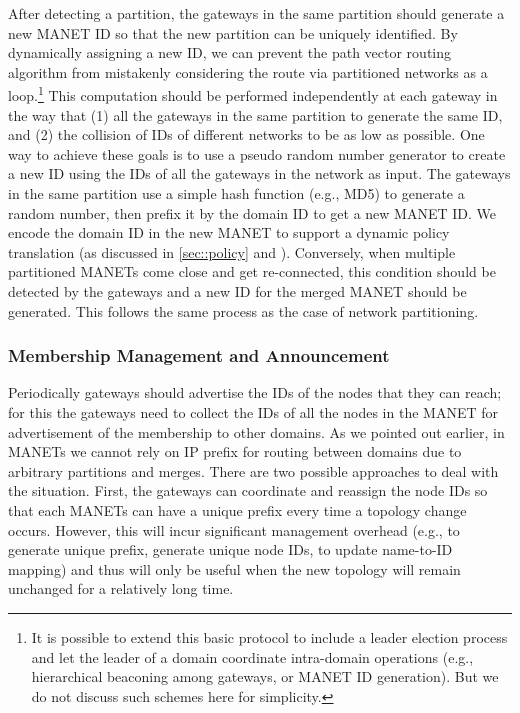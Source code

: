 After detecting a partition, the gateways in the same partition should generate a new MANET ID so that the new partition can be uniquely identified. By dynamically assigning a new ID, we can prevent the path vector routing algorithm from mistakenly considering the route via partitioned networks as a loop.\footnote{\small It is possible to extend this basic protocol to include a leader election process and let the leader of a domain coordinate intra-domain operations (e.g., hierarchical beaconing among gateways, or MANET ID generation). But we do not discuss such schemes here for simplicity.}
This computation should be performed independently at each gateway in the way that (1) all the gateways in the same partition to generate the same ID, and (2) the collision of IDs of different networks to be as low as possible. One way to achieve these goals is to use a pseudo random number generator to create a new ID using the IDs of all the gateways in the network as input. The gateways in the same partition use a simple hash function (e.g., MD5) to generate a random number, then prefix it by the domain ID to get a new MANET ID. We encode the domain ID in the new MANET to support a dynamic policy translation (as discussed in \ref{sec::policy} and \cite{policy08}). 
Conversely, when multiple partitioned MANETs come close and get re-connected, this condition should be detected by the gateways and a new ID for the merged MANET should be generated. This follows the same process as the case of network partitioning.

\subsubsection{Membership Management and Announcement} \label{sec::membership}

Periodically gateways should advertise the IDs of the nodes that they can reach; for this the gateways need to collect the IDs of all the nodes in the MANET for advertisement of the membership to other domains. As we pointed out earlier, in MANETs we cannot rely on IP prefix for routing between domains due to arbitrary partitions and merges. There are two possible approaches to deal with the situation. First, the gateways can coordinate and reassign the node IDs so that each MANETs can have a unique prefix every time a topology change occurs. However, this will incur significant management overhead (e.g., to generate unique prefix, generate unique node IDs, to update name-to-ID mapping) and thus will only be useful when the new topology will remain unchanged for a relatively long time.

